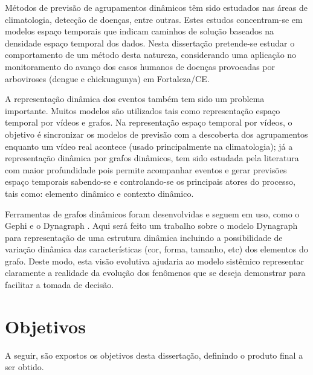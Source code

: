 Métodos de previsão de agrupamentos dinâmicos têm sido estudados nas áreas de climatologia, detecção de doenças, entre outras. Estes estudos concentram-se em modelos espaço temporais que indicam caminhos de solução baseados na densidade espaço temporal dos dados. Nesta dissertação pretende-se estudar o comportamento de um método desta natureza, considerando uma aplicação no monitoramento do avanço dos casos humanos de doenças provocadas por arboviroses (dengue e chickungunya) em Fortaleza/CE.

A representação dinâmica dos eventos também tem sido um problema importante. Muitos modelos são utilizados tais como representação espaço temporal por vídeos e grafos. Na representação espaço temporal por vídeos, o objetivo é sincronizar os modelos de previsão com a descoberta dos agrupamentos enquanto um vídeo real acontece (usado principalmente na climatologia); já a representação dinâmica por grafos dinâmicos, tem sido estudada pela literatura com maior profundidade pois permite acompanhar eventos e gerar previsões espaço temporais sabendo-se e controlando-se os principais atores do processo, tais como: elemento dinâmico e contexto dinâmico.

Ferramentas de grafos dinâmicos foram desenvolvidas e seguem em uso, como o Gephi e o Dynagraph \cite{dynagraph}. Aqui será feito um trabalho sobre o modelo Dynagraph para representação de uma estrutura dinâmica incluindo a possibilidade de variação dinâmica das características (cor, forma, tamanho, etc) dos elementos do grafo. Deste modo, esta visão evolutiva ajudaria ao modelo sistêmico representar claramente a realidade da evolução dos fenômenos que se deseja demonstrar para facilitar a tomada de decisão.





\section{Objetivos}
\label{sec:objetivos}
A seguir, são expostos os objetivos desta dissertação, definindo o produto
final a ser obtido.

